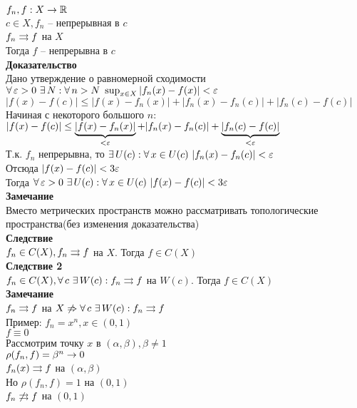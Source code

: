 \documentclass[12pt]{article}
\begin{document}
$f_n, f: X \rto \Rset$\\
$c \in X, f_n$ -- непрерывная в $c$\\
$f_n \rrto f$ на $X$\\
Тогда $f$ -- непрерывна в $c$\\
\textbf{Доказательство}\\
Дано утверждение о равномерной сходимости\\
$\fall \eps > 0\ \ex N: \fall n > N\ \sup_{x\in X} |f_n(x) - f(x)|<\eps$\\
$|f(x)-f(c)| \leq |f(x)-f_n(x)| + |f_n(x)-f_n(c)| + |f_n(c)-f(c)|$\\
Начиная с некоторого большого $n:$\\
$|f(x)-f(c)| \leq \ub{< \eps}{|f(x)-f_n(x)|} + |f_n(x)-f_n(c)| + \ub{< \eps}{|f_n(c)-f(c)|}$\\
Т.к. $f_n$ непрерывна, то $\ex U(c): \fall x \in U(c)\ |f_n(x)-f_n(c)| < \eps$\\
Отсюда $|f(x)-f(c)| < 3\eps$\\
Тогда $\fall \eps > 0\ \ex U(c): \fall x \in U(c)\ |f(x)-f(c)| < 3\eps$\\
\textbf{Замечание}\\
Вместо метрических пространств можно рассматривать топологические пространства(без изменения доказательства)\\
\textbf{Следствие}\\
$f_n \in C(X), f_n \rrto f$ на $X$. Тогда $f \in C(X)$\\
\textbf{Следствие 2}\\
$f_n \in C(X), \fall c\ \ex W(c): f_n \rrto f$ на $W(c)$. Тогда $f \in C(X)$\\
\textbf{Замечание}\\
$f_n \rrto f$ на $X \not \Rto \fall c\ \ex W(c): f_n \rrto f$\\
Пример: $f_n = x^n, x \in (0,1)$\\
$f \equiv 0$\\
Рассмотрим точку $x$ в $(\alpha, \beta), \beta \neq 1$\\
$\rho(f_n, f) = \beta^n \rto 0$\\
$f_n(x) \rrto f$ на $(\alpha, \beta)$\\
Но $\rho(f_n, f) = 1$ на $(0,1)$\\
$f_n \not\rrto f$ на $(0,1)$\\
\end{document}

